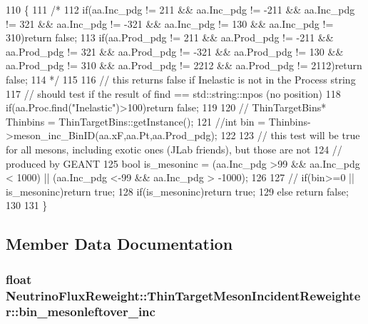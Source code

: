 \begin{DoxyCode}
110                                                                               \{
111     \textcolor{comment}{/*    }
112 \textcolor{comment}{    if(aa.Inc\_pdg != 211 && aa.Inc\_pdg != -211 && aa.Inc\_pdg != 321 && aa.Inc\_pdg != -321 && aa.Inc\_pdg !=
       130 && aa.Inc\_pdg != 310)return false;}
113 \textcolor{comment}{    if(aa.Prod\_pdg != 211 && aa.Prod\_pdg != -211 && aa.Prod\_pdg != 321 && aa.Prod\_pdg != -321 &&
       aa.Prod\_pdg != 130 && aa.Prod\_pdg != 310 && aa.Prod\_pdg != 2212 && aa.Prod\_pdg != 2112)return false;}
114 \textcolor{comment}{    */}
115     
116     \textcolor{comment}{// this returns false if Inelastic is not in the Process string}
117     \textcolor{comment}{// should test if the result of find == std::string::npos  (no position)}
118     \textcolor{keywordflow}{if}(aa.Proc.find(\textcolor{stringliteral}{"Inelastic"})>100)\textcolor{keywordflow}{return} \textcolor{keyword}{false};
119     
120     \textcolor{comment}{//  ThinTargetBins*  Thinbins =  ThinTargetBins::getInstance();}
121     \textcolor{comment}{//int bin      = Thinbins->meson\_inc\_BinID(aa.xF,aa.Pt,aa.Prod\_pdg);}
122 
123     \textcolor{comment}{// this test will be true for all mesons, including exotic ones (JLab friends), but those are not}
124     \textcolor{comment}{// produced by GEANT}
125     \textcolor{keywordtype}{bool} is\_mesoninc = (aa.Inc\_pdg >99 && aa.Inc\_pdg < 1000) || (aa.Inc\_pdg <-99 && aa.Inc\_pdg > -1000);
126 
127     \textcolor{comment}{//    if(bin>=0 || is\_mesoninc)return true;}
128     \textcolor{keywordflow}{if}(is\_mesoninc)\textcolor{keywordflow}{return} \textcolor{keyword}{true};
129     \textcolor{keywordflow}{else} \textcolor{keywordflow}{return} \textcolor{keyword}{false};
130     
131   \}
\end{DoxyCode}


\subsection{Member Data Documentation}
\hypertarget{class_neutrino_flux_reweight_1_1_thin_target_meson_incident_reweighter_af8a00936922518cafeca2199c385c3f8}{
\subsubsection[{bin\-\_\-mesonleftover\-\_\-inc}]{\setlength{\rightskip}{0pt plus 5cm}float Neutrino\-Flux\-Reweight\-::\-Thin\-Target\-Meson\-Incident\-Reweighter\-::bin\-\_\-mesonleftover\-\_\-inc}}\label{class_neutrino_flux_reweight_1_1_thin_target_meson_incident_reweighter_af8a00936922518cafeca2199c385c3f8}


